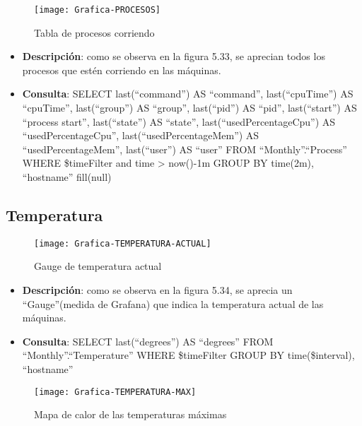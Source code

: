 \documentclass[ spanish, a4paper, 12pt, oneside]{report}
\begin{document}
\begin{figure}[!h]
   \centering
   \texttt{[image: Grafica-PROCESOS]}\\
      \caption{\label{fig: Tabla de procesos corriendo} Tabla de procesos corriendo}
\end{figure}

\begin{itemize}
   \item \textbf{Descripción}: como se observa en la figura 5.33, se aprecian todos los procesos que estén corriendo en las máquinas.
   \item \textbf{Consulta}: SELECT last(``command'') AS ``command'', last(``cpuTime'') AS ``cpuTime'', last(``group'') AS ``group'', last(``pid'') AS ``pid'', last(``start'') AS ``process start'', last(``state'') AS ``state'', last(``usedPercentageCpu'') AS ``usedPercentageCpu'', last(``usedPercentageMem'') AS ``usedPercentageMem'', last(``user'') AS ``user'' FROM ``Monthly''.``Process'' WHERE \$timeFilter and time > now()-1m GROUP BY time(2m), ``hostname'' fill(null)
\end{itemize}

\subsection{Temperatura}

\begin{figure}[!h]
   \centering
   \texttt{[image: Grafica-TEMPERATURA-ACTUAL]}\\
      \caption{\label{fig: Gauge de temperatura actual} Gauge de temperatura actual}
\end{figure}

\begin{itemize}
   \item \textbf{Descripción}: como se observa en la figura 5.34, se aprecia un ``Gauge''(medida de Grafana) que indica la temperatura actual de las máquinas.
   \item \textbf{Consulta}: SELECT last(``degrees'') AS ``degrees'' FROM ``Monthly''.``Temperature'' WHERE \$timeFilter GROUP BY time(\$\textunderscore\textunderscore interval), ``hostname''
\end{itemize}

\begin{figure}[!h]
   \centering
   \texttt{[image: Grafica-TEMPERATURA-MAX]}\\
      \caption{\label{fig: Mapa de calor de las temperaturas máximas} Mapa de calor de las temperaturas máximas}
\end{figure}
\end{document}
